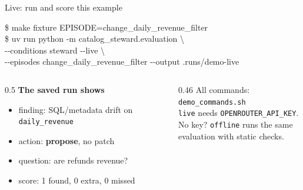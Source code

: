 \documentclass[aspectratio=169,11pt]{beamer}
\newcommand{\yes}{\textcolor{good}{\ding{51}}}
\begin{document}
\begin{frame}{Live: run and score this example}
  \begin{terminal}
\$ make fixture EPISODE=change\_daily\_revenue\_filter\\[0.3em]
\$ uv run python -m catalog\_steward.evaluation \textbackslash\\
\hspace*{2em}-{}-conditions steward -{}-live \textbackslash\\
\hspace*{2em}-{}-episodes change\_daily\_revenue\_filter -{}-output .runs/demo-live
  \end{terminal}
  \begin{columns}[T]
    \begin{column}{0.5\textwidth}
      \textbf{The saved run shows}
      \begin{itemize}
        \item finding: SQL/metadata drift on \texttt{daily\_revenue}
        \item action: \textbf{propose}, no patch
        \item question: are refunds revenue?
        \item score: 1 found, 0 extra, 0 missed \yes
      \end{itemize}
    \end{column}
    \begin{column}{0.46\textwidth}
      {\small\color{muted}
      All commands: \texttt{demo\_commands.sh}\\
      \texttt{live} needs \texttt{OPENROUTER\_API\_KEY}.\\
      No key? \texttt{offline} runs the same\\evaluation with static checks.}
    \end{column}
  \end{columns}
\end{frame}
\end{document}
